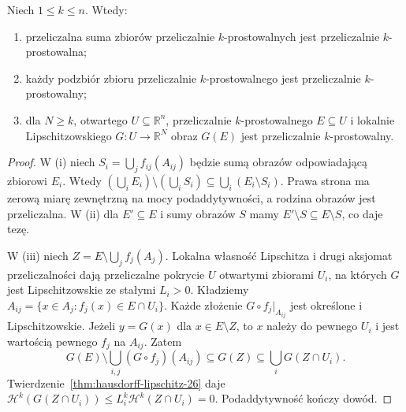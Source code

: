 \begin{lemat}
\label{lem:rectifiable-union-29}
Niech $1\le k\le n$. Wtedy:
\begin{enumerate}[label=(\roman*)]
\item przeliczalna suma zbiorów przeliczalnie
$k$-prostowalnych jest przeliczalnie $k$-prostowalna;
\item każdy podzbiór zbioru przeliczalnie
$k$-prostowalnego jest przeliczalnie $k$-prostowalny;
\item dla $N\ge k$, otwartego $U\subseteq\mathbb R^n$,
przeliczalnie $k$-prostowalnego $E\subseteq U$ i lokalnie
Lipschitzowskiego $G:U\to\mathbb R^N$ obraz $G(E)$
jest przeliczalnie $k$-prostowalny.
\end{enumerate}
\end{lemat}
\begin{proof}
W (i) niech $S_i=\bigcup_j f_{ij}(A_{ij})$ będzie
sumą obrazów odpowiadającą zbiorowi $E_i$. Wtedy
$(\bigcup_i E_i)\setminus(\bigcup_i S_i)
\subseteq\bigcup_i(E_i\setminus S_i)$.
Prawa strona ma zerową miarę zewnętrzną na mocy
podaddytywności, a rodzina obrazów jest przeliczalna.
W (ii) dla $E'\subseteq E$ i sumy obrazów $S$ mamy
$E'\setminus S\subseteq E\setminus S$, co daje tezę.

W (iii) niech $Z=E\setminus\bigcup_j f_j(A_j)$.
Lokalna własność Lipschitza i drugi aksjomat
przeliczalności dają przeliczalne pokrycie $U$
otwartymi zbiorami $U_i$, na których $G$ jest
Lipschitzowskie ze stałymi $L_i>0$.
Kładziemy $A_{ij}=\{x\in A_j:f_j(x)\in E\cap U_i\}$.
Każde złożenie $G\circ f_j|_{A_{ij}}$ jest określone
i Lipschitzowskie. Jeżeli $y=G(x)$ dla $x\in E\setminus Z$,
to $x$ należy do pewnego $U_i$ i jest wartością
pewnego $f_j$ na $A_{ij}$. Zatem
\[
 G(E)\setminus\bigcup_{i,j}(G\circ f_j)(A_{ij})
 \subseteq G(Z)\subseteq\bigcup_i G(Z\cap U_i).
\]
Twierdzenie~\ref{thm:hausdorff-lipschitz-26} daje
$\mathcal H^k(G(Z\cap U_i))\le L_i^k\mathcal H^k(Z\cap U_i)=0$.
Podaddytywność kończy dowód.
\end{proof}

